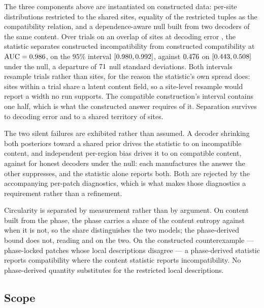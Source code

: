 \documentclass{article}
\begin{document}
The three components above are instantiated on constructed data: per-site distributions restricted to the shared sites, equality of the restricted tuples as the compatibility relation, and a dependence-aware null built from two decoders of the same content. Over \overlapTrials{} trials on an overlap of \overlapSites{} sites at decoding error \overlapDecodingError, the statistic separates constructed incompatibility from constructed compatibility at $\mathrm{AUC}=0.986$, on the $95\%$ interval $[0.980,0.992]$, against $0.476$ on $[0.443,0.508]$ under the null, a departure of $71$ null standard deviations. Both intervals resample trials rather than sites, for the reason the statistic's own spread does: sites within a trial share a latent content field, so a site-level resample would report a width no run supports. The compatible construction's interval contains one half, which is what the constructed answer requires of it. Separation survives to decoding error \overlapWorstUsableError{} and to a shared territory of \overlapSmallestTerritory{} sites.

The two silent failures are exhibited rather than assumed. A decoder shrinking both posteriors toward a shared prior drives the statistic to \overlapShrinkageStatistic{} on incompatible content, and independent per-region bias drives it to \overlapBiasStatistic{} on compatible content, against \overlapHonestStatistic{} for honest decoders under the null: each manufactures the answer the other suppresses, and the statistic alone reports both. Both are rejected by the accompanying per-patch diagnostics, which is what makes those diagnostics a requirement rather than a refinement.

Circularity is separated by measurement rather than by argument. On content built from the phase, the phase carries a share \overlapPhaseShareBuilt{} of the content entropy against \overlapPhaseShareFree{} when it is not, so the share distinguishes the two models; the phase-derived bound does not, reading \overlapPhaseBoundBuilt{} and \overlapPhaseBoundFree{} on the two. On the constructed counterexample --- phase-locked patches whose local descriptions disagree --- a phase-derived statistic reports compatibility where the content statistic reports incompatibility. No phase-derived quantity substitutes for the restricted local descriptions.

\subsection{Scope}
\end{document}
